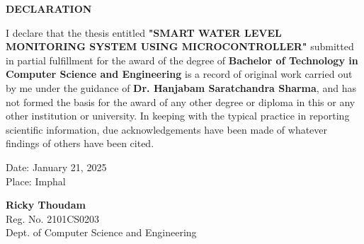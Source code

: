\vspace*{0.6cm}
\begin{center}
    \fontsize{16}{19}\selectfont
    \textbf{DECLARATION}\\[0.5cm]
\end{center}
\vspace{1cm}
{
\fontsize{12}{14}\selectfont
\noindent
I declare that the thesis entitled \textbf{"SMART WATER LEVEL MONITORING SYSTEM USING MICROCONTROLLER"} submitted in partial fulfillment for the award of the degree of \textbf{Bachelor of Technology in Computer Science and Engineering} is a record of original work carried out by me under the guidance of \textbf{Dr. Hanjabam Saratchandra Sharma}, and has not formed the basis for the award of any other degree or diploma in this or any other institution or university. In keeping with the typical practice in reporting scientific information, due acknowledgements have been made of whatever findings of others have been cited.

\vspace{2cm}
\noindent
\begin{minipage}[t]{0.45\textwidth} %
    \begin{flushleft}
        Date: January 21, 2025\\
        Place: Imphal
    \end{flushleft}
\end{minipage}%
\hfill %
\begin{minipage}[t]{0.40\textwidth} %
    \begin{flushright}
        \begin{center}
            \textbf{Ricky Thoudam}\\
            Reg. No. 2101CS0203\\
            Dept. of Computer Science and Engineering
        \end{center}
    \end{flushright}
\end{minipage}
} 



